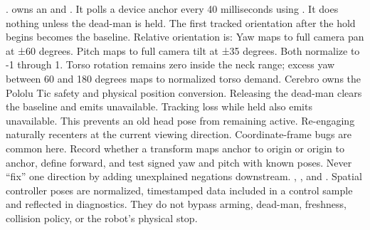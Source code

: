 {}
\markdownRendererSectionEnd \markdownRendererSectionBegin
{}\markdownRendererInterblockSeparator
{}\markdownRendererBlockQuoteBegin
{} .\markdownRendererBlockQuoteEnd \markdownRendererInterblockSeparator
{} owns an  and . It polls a device anchor every 40 milliseconds using . It does nothing unless the dead-man is held.\markdownRendererParagraphSeparator
{}The first tracked orientation after the hold begins becomes the baseline. Relative orientation is:\markdownRendererInterblockSeparator
{}\markdownRendererInterblockSeparator
{}Yaw maps to full camera pan at ±60 degrees. Pitch maps to full camera tilt at ±35 degrees. Both normalize to -1 through 1. Torso rotation remains zero inside the neck range; excess yaw between 60 and 180 degrees maps to normalized torso demand. Cerebro owns the Pololu Tic safety and physical position conversion.\markdownRendererParagraphSeparator
{}Releasing the dead-man clears the baseline and emits unavailable. Tracking loss while held also emits unavailable. This prevents an old head pose from remaining active. Re-engaging naturally recenters at the current viewing direction.\markdownRendererParagraphSeparator
{}Coordinate-frame bugs are common here. Record whether a transform maps anchor to origin or origin to anchor, define forward, and test signed yaw and pitch with known poses. Never “fix” one direction by adding unexplained negations downstream.\markdownRendererInterblockSeparator
{}
\markdownRendererSectionEnd \markdownRendererSectionBegin
{}\markdownRendererInterblockSeparator
{}\markdownRendererBlockQuoteBegin
{} , , and .\markdownRendererBlockQuoteEnd \markdownRendererInterblockSeparator
{}Spatial controller poses are normalized, timestamped data included in a control sample and reflected in diagnostics. They do not bypass arming, dead-man, freshness, collision policy, or the robot's physical stop.\markdownRendererParagraphSeparator

